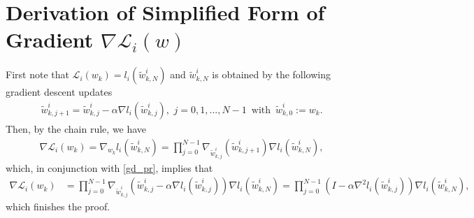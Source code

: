 \documentclass{osudissert96}
\begin{document}
\section{Derivation of Simplified Form of  Gradient $\nabla \mathcal{L}_i(w)$}\label{simplifeid}
First note that $\mathcal{L}_i(w_k) = l_i(\widetilde w_{k,N}^i)$ and $\widetilde w_{k,N}^i$ is obtained by the following gradient descent updates
\begin{align}\label{gd_pr}
\widetilde w^i_{k, j+1} =\widetilde w^i_{k,j} - \alpha \nabla l_i(\widetilde w^i_{k,j}), \,\,j = 0, 1,..., N-1 \, \text{ with }\, \widetilde w^i_{k,0} := w_k.
\end{align}
Then, by the chain rule, we have 
\begin{align*}
\nabla \mathcal{L}_i(w_k) = \nabla_{w_k} l_i(\widetilde w_{k,N}^i) = \prod_{j=0}^{N-1}\nabla_{\widetilde w_{k,j}^i} \left(\widetilde w_{k,j+1}^i\right) \nabla l_i(\widetilde w_{k,N}^i), 
\end{align*}
which, in conjunction with \cref{gd_pr}, implies that 
\begin{align*}
\nabla \mathcal{L}_i(w_k) &=\prod_{j=0}^{N-1}\nabla_{\widetilde w_{k,j}^i} \left(\widetilde w^i_{k,j} - \alpha \nabla l_i(\widetilde w^i_{k,j})\right) \nabla l_i(\widetilde w_{k,N}^i)
 = 
\prod_{j=0}^{N-1} \left(I - \alpha \nabla^2 l_i(\widetilde w^i_{k,j})\right) \nabla l_i(\widetilde w_{k,N}^i),
\end{align*}
which finishes the proof. 



\end{document}
